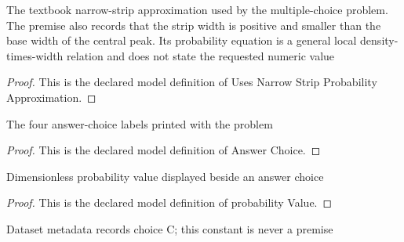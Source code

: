 \begin{definition}
  \label{def:physics:phyx-mini-0502:phyxminiproblems-problemphyxmini0502-usesnarrowstripprobabilityapproximation}
  The textbook narrow-strip approximation used by the multiple-choice problem. The premise also records that the strip width is positive and smaller than the base width of the central peak. Its probability equation is a general local density-times-width relation and does not state the requested numeric value
\end{definition}
\begin{proof}
  This is the declared model definition of Uses Narrow Strip Probability Approximation.
\end{proof}
\begin{definition}
  \label{def:physics:phyx-mini-0502:phyxminiproblems-problemphyxmini0502-answerchoice}
  The four answer-choice labels printed with the problem
\end{definition}
\begin{proof}
  This is the declared model definition of Answer Choice.
\end{proof}
\begin{definition}
  \label{def:physics:phyx-mini-0502:phyxminiproblems-problemphyxmini0502-answerchoice-probabilityvalue}
  Dimensionless probability value displayed beside an answer choice
\end{definition}
\begin{proof}
  This is the declared model definition of probability Value.
\end{proof}
\begin{definition}
  \label{def:physics:phyx-mini-0502:phyxminiproblems-problemphyxmini0502-recordedanswerchoice}
  Dataset metadata records choice C; this constant is never a premise
\end{definition}

